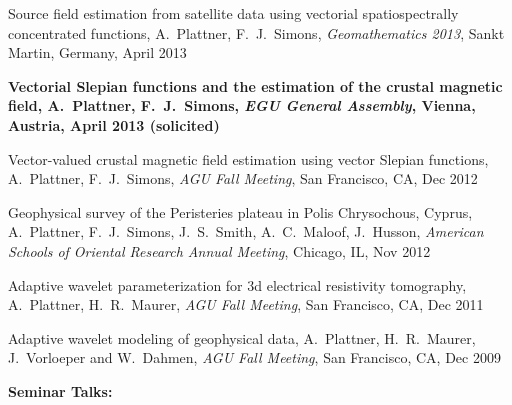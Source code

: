 \documentclass[10pt]{article}
\begin{document}
\spcp
Source field estimation from satellite data using vectorial spatiospectrally 
concentrated functions,
A.~Plattner, F.~J.~Simons,
\emph{Geomathematics 2013}, Sankt Martin, Germany, April 2013

\spcp
\textbf{Vectorial Slepian functions and the estimation of the crustal magnetic field,
A.~Plattner, F.~J.~Simons,
\emph{EGU General Assembly}, Vienna, Austria, April 2013 (solicited)}

\spcp
Vector-valued crustal magnetic field estimation using vector Slepian functions,
A.~Plattner, F.~J.~Simons,
\emph{AGU Fall Meeting}, San Francisco, CA, Dec 2012

\spcp
Geophysical survey of the Peristeries plateau in Polis Chrysochous, Cyprus,
A.~Plattner, F.~J.~Simons, J.~S.~Smith, A.~C.~Maloof, J.~Husson,
\emph{American Schools of Oriental Research Annual Meeting}, Chicago, IL, Nov 2012

\spcp
Adaptive wavelet parameterization for 3d electrical resistivity tomography,
A.~Plattner, H.~R.~Maurer, 
\emph{AGU Fall Meeting}, San Francisco, CA, Dec 2011

\spcp
Adaptive wavelet modeling of geophysical data,
A.~Plattner, H.~R.~Maurer, J.~Vorloeper and W.~Dahmen, 
\emph{AGU Fall Meeting}, San Francisco, CA, Dec 2009




\spc
\textbf{\tsize Seminar Talks:}
\end{document}
